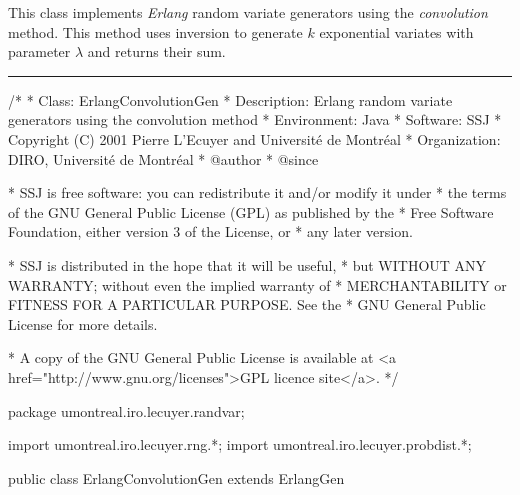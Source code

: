 
This class implements {\em Erlang\/} random variate generators using
the {\em convolution\/} method.  This method uses inversion to
generate $k$ exponential variates with parameter $\lambda$ and returns
their sum.


\bigskip\hrule

\begin{code}
\begin{hide}
/*
 * Class:        ErlangConvolutionGen
 * Description:  Erlang random variate generators using the convolution method
 * Environment:  Java
 * Software:     SSJ 
 * Copyright (C) 2001  Pierre L'Ecuyer and Université de Montréal
 * Organization: DIRO, Université de Montréal
 * @author       
 * @since

 * SSJ is free software: you can redistribute it and/or modify it under
 * the terms of the GNU General Public License (GPL) as published by the
 * Free Software Foundation, either version 3 of the License, or
 * any later version.

 * SSJ is distributed in the hope that it will be useful,
 * but WITHOUT ANY WARRANTY; without even the implied warranty of
 * MERCHANTABILITY or FITNESS FOR A PARTICULAR PURPOSE.  See the
 * GNU General Public License for more details.

 * A copy of the GNU General Public License is available at
   <a href="http://www.gnu.org/licenses">GPL licence site</a>.
 */
\end{hide}
package umontreal.iro.lecuyer.randvar;\begin{hide}
import umontreal.iro.lecuyer.rng.*;
import umontreal.iro.lecuyer.probdist.*;
\end{hide}

public class ErlangConvolutionGen extends ErlangGen \begin{hide} {
\end{hide}\end{code}

